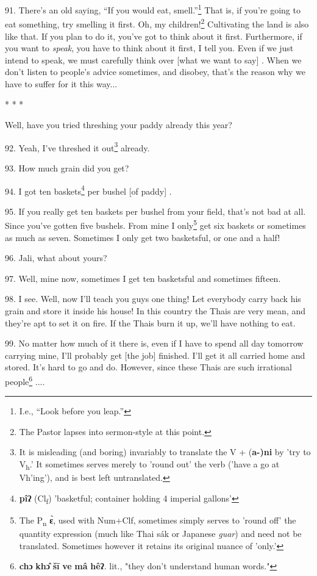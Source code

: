 91. There's an old saying, ``If you would eat, smell.''\footnote{I.e., ``Look before you leap.''} That
is, if you're going to eat something, try smelling it first. Oh, my children!\footnote{The Pastor lapses into sermon-style at this point.}
Cultivating the land is also like that. If you plan to do it, you've got to think
about it first. Furthermore, if you want to \textit{speak}, you have to think about
it first, I tell you. Even if we just intend to speak, we must carefully think
over [what we want to say] . When we don't listen to people's advice sometimes,
and disobey, that's the reason why we have to suffer for it this way...

\begin{center}
* * *
\end{center}

Well, have you tried threshing your paddy already this year?

92. Yeah, I've threshed it out\footnote{It is misleading (and boring) invariably to translate the V + (\textbf{a-)ni} by 'try to V\textsubscript{h}.' It sometimes serves merely to 'round out' the verb ('have a go at Vh'ing'), and is best left untranslated.} already.

93. How much grain did you get?

94. I got ten baskets\footnote{\textbf{pîʔ} (Cl\textsubscript{f}) 'basketful; container holding 4 imperial gallons'} per bushel [of paddy] .

95. If you really get ten baskets per bushel from your field, that's not bad at
all. Since you've gotten five bushels. From mine I only\footnote{The P\textsubscript{n } \textbf{ɛ̀}, used with Num+Clf, sometimes simply serves to 'round off' the quantity expression (much like Thai sák or Japanese \textit{guar}) and need not be translated. Sometimes however it retains its original nuance of 'only.'} get six baskets or
sometimes as much as seven. Sometimes I only get two basketsful, or one and a half!

96. Jali, what about yours?

97. Well, mine now, sometimes I get ten basketsful and sometimes fifteen.

98. I see. Well, now I'll teach you guys one thing! Let everybody carry back his
grain and store it inside his house! In this country the Thais are very mean, and
they're apt to set it on fire. If the Thais burn it up, we'll have nothing to eat.

99. No matter how much of it there is, even if I have to spend all day tomorrow
carrying mine, I'll probably get [the job] finished. I'll get it all carried home
and stored. It's hard to go and do. However, since these Thais are such irrational
people\footnote{\textbf{chɔ} \textbf{khɔ̂} \textbf{šī} \textbf{ve} \textbf{mâ} \textbf{hêʔ}. lit., "they don't understand human words."} ....

